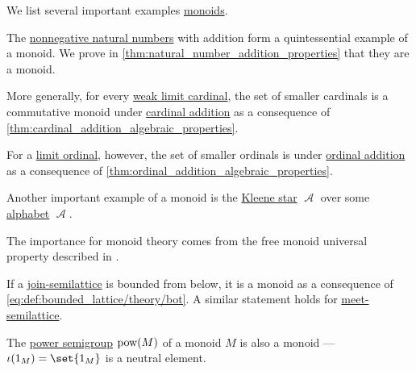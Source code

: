 \begin{example}\label{ex:def:monoid}
  We list several important examples \hyperref[def:monoid]{monoids}.

  \begin{thmenum}
     The \hyperref[def:natural_numbers]{nonnegative natural numbers} with addition form a quintessential example of a monoid. We prove in \cref{thm:natural_number_addition_properties} that they are a monoid.

     More generally, for every \hyperref[def:successor_and_limit_cardinal/weak_limit]{weak limit cardinal}, the set of smaller cardinals is a commutative monoid under \hyperref[def:cardinal_arithmetic/addition]{cardinal addition} as a consequence of \cref{thm:cardinal_addition_algebraic_properties}.

     For a \hyperref[def:successor_and_limit_ordinal]{limit ordinal}, however, the set of smaller ordinals is  under \hyperref[def:ordinal_arithmetic/addition]{ordinal addition} as a consequence of \cref{thm:ordinal_addition_algebraic_properties}.

     Another important example of a monoid is the \hyperref[def:formal_language/kleene_star]{Kleene star} \( \mscrA \) over some \hyperref[def:formal_language]{alphabet} \( \mscrA \).

    The importance for monoid theory comes from the free monoid universal property described in .

     If a \hyperref[def:semilattice]{join-semilattice} is bounded from below, it is a monoid as a consequence of \eqref{eq:def:bounded_lattice/theory/bot}. A similar statement holds for \hyperref[def:lattice/meet]{meet-semilattice}.

     The \hyperref[def:power_semigroup]{power semigroup} \( \operatorname{pow}(M) \) of a monoid \( M \) is also a monoid --- \( \iota(1_M) = \set{ 1_M } \) is a neutral element.
  \end{thmenum}
\end{example}

